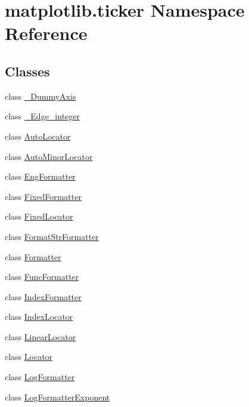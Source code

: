 \hypertarget{namespacematplotlib_1_1ticker}{}\section{matplotlib.\+ticker Namespace Reference}
\label{namespacematplotlib_1_1ticker}
\subsection*{Classes}
\begin{DoxyCompactItemize}
\item 
class \hyperlink{classmatplotlib_1_1ticker_1_1__DummyAxis}{\+\_\+\+Dummy\+Axis}
\item 
class \hyperlink{classmatplotlib_1_1ticker_1_1__Edge__integer}{\+\_\+\+Edge\+\_\+integer}
\item 
class \hyperlink{classmatplotlib_1_1ticker_1_1AutoLocator}{Auto\+Locator}
\item 
class \hyperlink{classmatplotlib_1_1ticker_1_1AutoMinorLocator}{Auto\+Minor\+Locator}
\item 
class \hyperlink{classmatplotlib_1_1ticker_1_1EngFormatter}{Eng\+Formatter}
\item 
class \hyperlink{classmatplotlib_1_1ticker_1_1FixedFormatter}{Fixed\+Formatter}
\item 
class \hyperlink{classmatplotlib_1_1ticker_1_1FixedLocator}{Fixed\+Locator}
\item 
class \hyperlink{classmatplotlib_1_1ticker_1_1FormatStrFormatter}{Format\+Str\+Formatter}
\item 
class \hyperlink{classmatplotlib_1_1ticker_1_1Formatter}{Formatter}
\item 
class \hyperlink{classmatplotlib_1_1ticker_1_1FuncFormatter}{Func\+Formatter}
\item 
class \hyperlink{classmatplotlib_1_1ticker_1_1IndexFormatter}{Index\+Formatter}
\item 
class \hyperlink{classmatplotlib_1_1ticker_1_1IndexLocator}{Index\+Locator}
\item 
class \hyperlink{classmatplotlib_1_1ticker_1_1LinearLocator}{Linear\+Locator}
\item 
class \hyperlink{classmatplotlib_1_1ticker_1_1Locator}{Locator}
\item 
class \hyperlink{classmatplotlib_1_1ticker_1_1LogFormatter}{Log\+Formatter}
\item 
class \hyperlink{classmatplotlib_1_1ticker_1_1LogFormatterExponent}{Log\+Formatter\+Exponent}

\end{DoxyCompactItemize}
